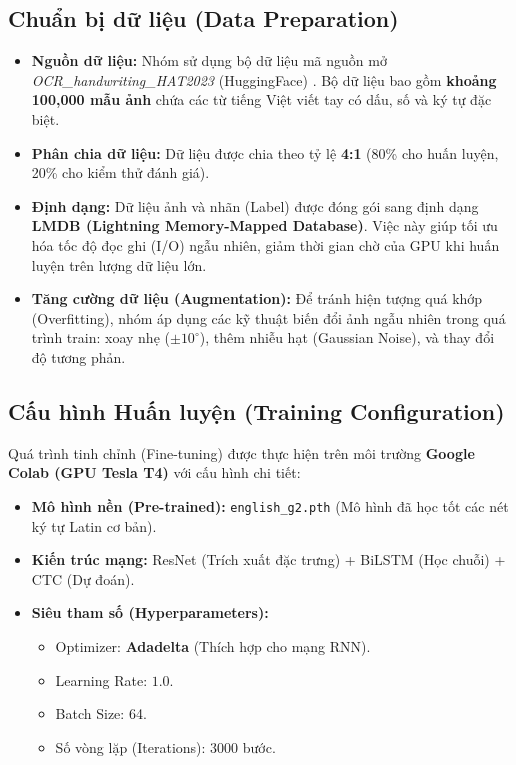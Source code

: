 \documentclass[6pt, a4paper]{report}
\begin{document}
	\subsection{Chuẩn bị dữ liệu (Data Preparation)}
	\begin{itemize}
		\item \textbf{Nguồn dữ liệu:} Nhóm sử dụng bộ dữ liệu mã nguồn mở \textit{OCR\_handwriting\_HAT2023} (HuggingFace) \cite{hat2023}. Bộ dữ liệu bao gồm \textbf{khoảng 100,000 mẫu ảnh} chứa các từ tiếng Việt viết tay có dấu, số và ký tự đặc biệt.
		\item \textbf{Phân chia dữ liệu:} Dữ liệu được chia theo tỷ lệ \textbf{4:1} (80\% cho huấn luyện, 20\% cho kiểm thử đánh giá).
		\item \textbf{Định dạng:} Dữ liệu ảnh và nhãn (Label) được đóng gói sang định dạng \textbf{LMDB (Lightning Memory-Mapped Database)}. Việc này giúp tối ưu hóa tốc độ đọc ghi (I/O) ngẫu nhiên, giảm thời gian chờ của GPU khi huấn luyện trên lượng dữ liệu lớn.
		\item \textbf{Tăng cường dữ liệu (Augmentation):} Để tránh hiện tượng quá khớp (Overfitting), nhóm áp dụng các kỹ thuật biến đổi ảnh ngẫu nhiên trong quá trình train: xoay nhẹ ($\pm 10^\circ$), thêm nhiễu hạt (Gaussian Noise), và thay đổi độ tương phản.
	\end{itemize}
	
	\subsection{Cấu hình Huấn luyện (Training Configuration)}
	Quá trình tinh chỉnh (Fine-tuning) được thực hiện trên môi trường \textbf{Google Colab (GPU Tesla T4)} với cấu hình chi tiết:
	\begin{itemize}
		\item \textbf{Mô hình nền (Pre-trained):} \texttt{english\_g2.pth} (Mô hình đã học tốt các nét ký tự Latin cơ bản).
		\item \textbf{Kiến trúc mạng:} ResNet (Trích xuất đặc trưng) + BiLSTM (Học chuỗi) + CTC (Dự đoán).
		\item \textbf{Siêu tham số (Hyperparameters):}
		\begin{itemize}
			\item Optimizer: \textbf{Adadelta} (Thích hợp cho mạng RNN).
			\item Learning Rate: $1.0$.
			\item Batch Size: 64.
			\item Số vòng lặp (Iterations): 3000 bước.
		\end{itemize}
	\end{itemize}
	
\end{document}
